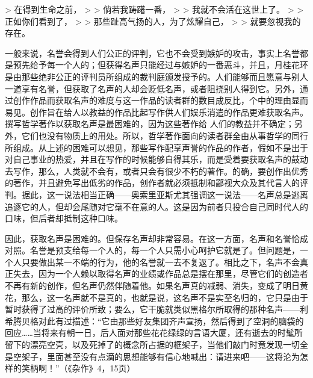 \documentclass[12pt,oneside]{book}
\begin{document}
 

> 在得到生命之前， 
>
> 倘若我踌躇一番， 
>
> 我就不会活在这世上了。 
>
> 正如你们看到了， 
>
> 那些趾高气扬的人，为了炫耀自己， 
>
> 就要忽视我的存在。 

 

一般来说，名誉会得到人们公正的评判，它也不会受到嫉妒的攻击，事实上名誉都是预先给予每一个人的；但获得名声只能经过与嫉妒的一番恶斗，并且，月桂花环是由那些绝非公正的评判员所组成的裁判庭颁发授予的。人们能够而且愿意与别人一道享有名誉，但获取了名声的人却会贬低名声，或者阻挠别人得到它。另外，通过创作作品而获取名声的难度与这一作品的读者群的数目成反比，个中的理由显而易见。创作旨在给人以教益的作品比起写作供人们娱乐消遣的作品更难获取名声。撰写哲学著作以获取名声是最困难的，因为这些著作给
人们的教益并不确定；另外，它们也没有物质上的用处。所以，哲学著作面向的读者群全由从事哲学的同行所组成。从上述的困难可以想见，那些写作配享声誉的作品的作者，假如不是出于对自己事业的热爱，并且在写作的时候能够自得其乐，而是受着要获取名声的鼓动去写作，那么，人类就不会有，或者只会有很少不朽的著作。的确，要创作出优秀的著作，并且避免写出低劣的作品，创作者就必须抵制和鄙视大众及其代言人的评判。据此，这一说法相当正确——奥索里亚斯尤其强调这一说法——名声总是逃离追逐它的人，但却会尾随对它毫不在意的人。这是因为前者只投合自己同时代人的口味，但后者却抵制这种口味。 

因此，获取名声是困难的。但保存名声却非常容易。在这一方面，名声和名誉恰成对照。名誉是预支给每一个人的，每一个人只需小心呵护它就是了。但问题是，一个人只要做出某一不端的行为，他的名誉就一去不复返了。相比之下，名声不会真正失去，因为一个人赖以取得名声的业绩或作品总是摆在那里，尽管它们的创造者不再有新的创作，但名声仍然伴随着他。如果名声真的减弱、消失，变成了明日黄花，那么，这一名声就不是真的，也就是说，这名声不是实至名归的，它只是由于暂时获得了过高的评价所致；要么，它干脆就类似黑格尔所取得的那种名声——利希腾贝格对此有过描述：“它由那些好友集团齐声宣扬，然后得到了空洞的脑袋的回应……当将来有朝一日，后人面对那些花花绿绿的言语大厦，还有逝去的时髦所留下的漂亮空壳，以及死掉了的概念所占据的框架子，当他们敲门时竟发现一切全是空架子，里面甚至没有点滴的思想能够有信心地喊出：请进来吧——这将沦为怎样的笑柄啊！”（《杂作》4，15页） 
\end{document}
